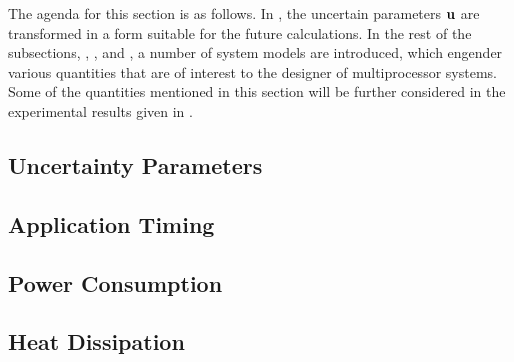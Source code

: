 The agenda for this section is as follows. In , the
uncertain parameters $\mathbf{u}$ are transformed in a form suitable for the future
calculations. In the rest of the subsections, ,
, and , a number of system models
are introduced, which engender various quantities that are of interest to the
designer of multiprocessor systems. Some of the quantities mentioned in this
section will be further considered in the experimental results given in
.

\subsection{Uncertainty Parameters} 


\subsection{Application Timing} 


\subsection{Power Consumption} 


\subsection{Heat Dissipation} 

